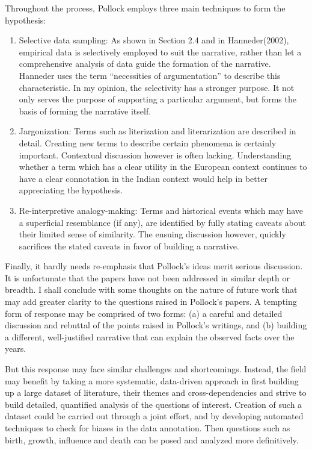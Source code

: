 Throughout the process, Pollock employs three main techniques to form the hypothesis: 
\begin{enumerate}
\itemsep=0pt
\item Selective data sampling: As shown in Section 2.4 and in Hanneder(2002), empirical data is selectively employed to suit the narrative, rather than let a comprehensive analysis of data guide the formation of the narrative. Hanneder uses the term “necessities of argumentation” to describe this characteristic. In my opinion, the selectivity has a stronger purpose. It not only serves the purpose of supporting a particular argument, but forms the basis of forming the narrative itself.  

\item Jargonization: Terms such as literization and literarization are described in detail.  Creating new terms to describe certain phenomena is certainly important. Contextual discussion however is often lacking. Understanding whether a term which has a clear utility in the European context continues to have a clear connotation in the Indian context would help in better appreciating the hypothesis.

\item Re-interpretive analogy-making: Terms and historical events which may have a superficial resemblance (if any), are identified by fully stating caveats about their limited sense of similarity. The ensuing discussion however, quickly sacrifices the stated caveats in favor of building a narrative.
\end{enumerate}

Finally, it hardly needs re-emphasis that Pollock’s ideas merit serious discussion. It is unfortunate that the papers have not been addressed in similar depth or breadth. I shall conclude with some thoughts on the nature of future work that may add greater clarity to the questions raised in Pollock’s papers. A tempting form of response may be comprised of two forms: (a) a careful and detailed discussion and rebuttal of the points raised in Pollock’s writings, and (b) building a different, well-justified narrative that can explain the observed facts over the years. 

But this response may face similar challenges and shortcomings. Instead, the field may benefit by taking a more systematic, data-driven approach in first building up a large dataset of literature, their themes and cross-dependencies and strive to build detailed, quantified analysis of the questions of interest. Creation of such a dataset could be carried out through a joint effort, and by developing automated techniques to check for biases in the data annotation. Then questions such as birth, growth, influence and death can be posed and analyzed more definitively.
\newpage

